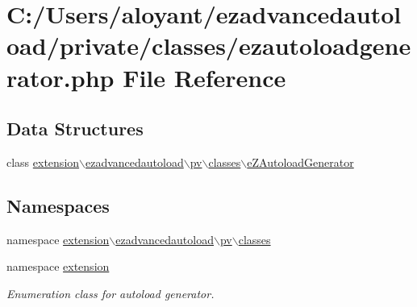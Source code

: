 \hypertarget{ezautoloadgenerator_8php}{\section{C\-:/\-Users/aloyant/ezadvancedautoload/private/classes/ezautoloadgenerator.php File Reference}
\label{ezautoloadgenerator_8php}
}
\subsection*{Data Structures}
\begin{DoxyCompactItemize}
\item 
class \hyperlink{classextension_1_1ezadvancedautoload_1_1pv_1_1classes_1_1e_z_autoload_generator}{extension$\backslash$ezadvancedautoload$\backslash$pv$\backslash$classes$\backslash$e\-Z\-Autoload\-Generator}
\end{DoxyCompactItemize}
\subsection*{Namespaces}
\begin{DoxyCompactItemize}
\item 
namespace \hyperlink{namespaceextension_1_1ezadvancedautoload_1_1pv_1_1classes}{extension$\backslash$ezadvancedautoload$\backslash$pv$\backslash$classes}
\item 
namespace \hyperlink{namespaceextension}{extension}
\begin{DoxyCompactList}\small\item\em Enumeration class for autoload generator. \end{DoxyCompactList}\end{DoxyCompactItemize}
